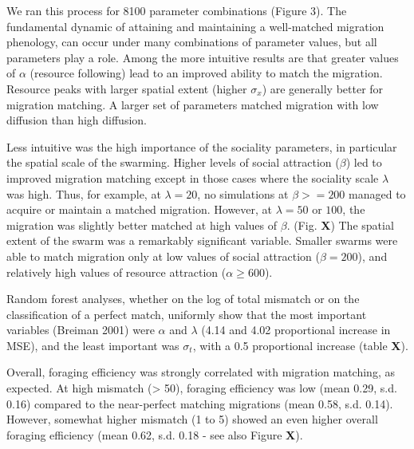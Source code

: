 \documentclass[12pt]{article}
\begin{document}
We ran this process for 8100 parameter combinations (Figure 3). The
fundamental dynamic of attaining and maintaining a well-matched
migration phenology, can occur under many combinations of parameter
values, but all parameters play a role. Among the more intuitive results
are that greater values of \(\alpha\) (resource following) lead to an
improved ability to match the migration. Resource peaks with larger
spatial extent (higher \(\sigma_x\)) are generally better for migration
matching. A larger set of parameters matched migration with low
diffusion than high diffusion.

Less intuitive was the high importance of the sociality parameters, in
particular the spatial scale of the swarming. Higher levels of social
attraction (\(\beta\)) led to improved migration matching except in
those cases where the sociality scale \(\lambda\) was high. Thus, for
example, at \(\lambda = 20\), no simulations at \(\beta >= 200\) managed
to acquire or maintain a matched migration. However, at \(\lambda = 50\)
or \(100\), the migration was slightly better matched at high values of
\(\beta\). (Fig. \textbf{X}) The spatial extent of the swarm was a
remarkably significant variable. Smaller swarms were able to match
migration only at low values of social attraction (\(\beta = 200\)), and
relatively high values of resource attraction (\(\alpha \geq 600\)).

Random forest analyses, whether on the log of total mismatch or on the
classification of a perfect match, uniformly show that the most
important variables (Breiman 2001) were \(\alpha\) and \(\lambda\) (4.14
and 4.02 proportional increase in MSE), and the least important was
\(\sigma_t\), with a 0.5 proportional increase (table \textbf{X}).

Overall, foraging efficiency was strongly correlated with migration
matching, as expected. At high mismatch (\textgreater{} 50), foraging
efficiency was low (mean 0.29, s.d. 0.16) compared to the near-perfect
matching migrations (mean 0.58, s.d. 0.14). However, somewhat higher
mismatch (1 to 5) showed an even higher overall foraging efficiency
(mean 0.62, s.d. 0.18 - see also Figure \textbf{X}).
\end{document}
